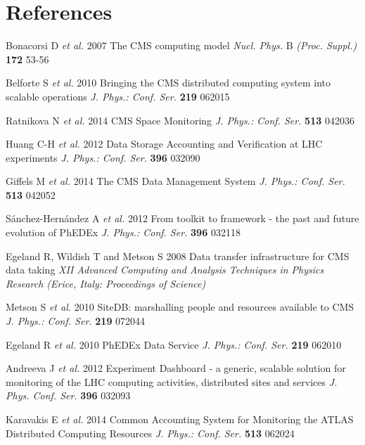 \section*{References}

\begin{thebibliography}{1}

 Bonacorsi D {\it et al.} 2007 The CMS computing model 
{\it Nucl. Phys.} B {\it (Proc. Suppl.)} {\bf 172} 53-56

 Belforte S {\it et al.} 2010 Bringing the CMS distributed computing system into scalable operations 
{\it J. Phys.: Conf. Ser.} {\bf 219} 062015

Ratnikova N {\it et al.} 2014 CMS Space Monitoring {\it J. Phys.: Conf. Ser.} {\bf 513} 042036 

Huang C-H {\it et al.} 2012 Data Storage Accounting and Verification at LHC experiments 
{\it J. Phys.: Conf. Ser.} {\bf 396} 032090

Giffels M {\it et al.} 2014 The CMS Data Management System {\it J. Phys.: Conf. Ser.} {\bf 513} 042052

S\'{a}nchez-Hern\'{a}ndez A {\it et al.} 2012 From toolkit to framework - the past and future evolution of PhEDEx  
{\it J. Phys.: Conf. Ser.} {\bf 396} 032118 

Egeland R, Wildish T and Metson S 2008 Data transfer infrastructure for CMS data taking 
{\it XII Advanced Computing and Analysis Techniques in Physics Research (Erice, Italy: Proceedings of Science)}


Metson S {\it et al.} 2010 SiteDB: marshalling people and resources available to CMS
{\it J. Phys.: Conf. Ser.} {\bf 219} 072044


Egeland  R {\it et al.} 2010  PhEDEx Data Service 
{\it J. Phys.: Conf. Ser.} {\bf 219} 062010

  Andreeva J {\it et al.} 2012 Experiment Dashboard - a generic, scalable solution for 
monitoring of the LHC computing activities, distributed sites and services 
{\it J. Phys. Conf. Ser.} {\bf 396} 032093


Karavakis E {\it et al.}  2014 Common Accounting System for Monitoring the ATLAS 
Distributed Computing Resources
{\it J. Phys.: Conf. Ser.} {\bf 513} 062024

\end{thebibliography}
